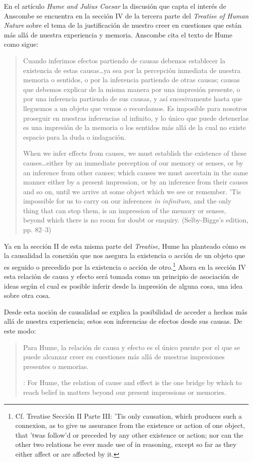 En el artículo \emph{Hume and Julius Caesar} la discusión que capta el interés
de Anscombe se encuentra en la sección IV de la tercera parte del \emph{Treatise
  of Human Nature} sobre el tema de la justificación de nuestro creer en
cuestiones que están más allá de nuestra experiencia y memoria. Anscombe cita el
texto de Hume como sigue:

\blockquote[{\cite[86]{anscombe1981hjc}}When we infer effects from causes, we
must establish the existence of these causes\ldots either by an immediate
perception of our memory or senses, or by an inference from other causes; which
causes we must ascertain in the same manner either by a present impression, or
by an inference from their causes and so on, until we arrive at some object
which we see or remember. 'Tis impossible for us to carry on our inferences
\emph{in infinitum}, and the only thing that can stop them, is an impression of
the memory or senses, beyond which there is no room for doubt or enquiry.
(Selby-Bigge's edition, pp. 82--3)]{Cuando inferimos efectos partiendo de causas
  debemos establecer la existencia de estas causas\ldots ya sea por la
  percepción inmediata de nuestra memoria o sentidos, o por la inferencia
  partiendo de otras causas; causas que debemos explicar de la misma manera por
  una impresión presente, o por una inferencia partiendo de sus causas, y así
  sucesivamente hasta que lleguemos a un objeto que vemos o recordamos. Es
  imposible para nosotros proseguir en nuestras inferencias al infinito, y lo
  único que puede detenerlas es una impresión de la memoria o los sentidos más
  allá de la cual no existe espacio para la duda o indagación.}

Ya en la sección II de esta misma parte del \emph{Treatise}, Hume ha planteado
cómo es la causalidad la conexión que nos asegura la existencia o acción de un
objeto que es seguido o precedido por la existencia o acción de
otro.\footnote{Cf. Treatise Sección II Parte III: ’Tis only causation, which
  produces such a connexion, as to give us assurance from the existence or
  action of one object, that ’twas follow’d or preceded by any other existence
  or action; nor can the other two relations be ever made use of in reasoning,
  except so far as they either affect or are affected by it. }
Ahora en la sección IV esta relación de causa y efecto será tomada como un
principio de asociación de ideas según el cual es posible inferir desde la
impresión de alguna cosa, una idea sobre otra cosa.

Desde esta noción de causalidad se explica la posibilidad de acceder a hechos
más allá de nuestra experiencia; estos son inferencias de efectos desde sus
causas. De este modo: \blockquote[{\cite[87]{anscombe1981hjc}}: For Hume, the
relation of cause and effect is the one bridge by which to reach belief in
matters beyond our present impressions or memories.]{Para Hume, la relación de
  causa y efecto es el único puente por el que se puede alcanzar creer en
  cuestiones más allá de nuestras impresiones presentes o memorias.}

